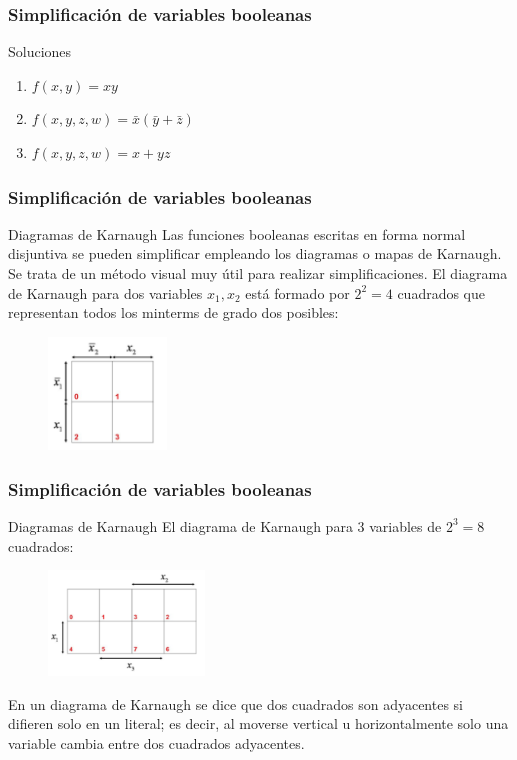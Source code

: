 \documentclass{beamer}
\begin{document}
\begin{frame}
\frametitle{Simplificaci\'on de variables booleanas}
\begin{block}{Soluciones}

\begin{enumerate}
\item $f(x,y) =xy$
\item $f(x,y,z,w) = \bar x (\bar y + \bar z)$
\item $f(x,y,z,w) =x + yz$
\end{enumerate}

\end{block}
\end{frame}





\begin{frame}
\frametitle{Simplificaci\'on de variables booleanas}
\begin{block}{Diagramas de Karnaugh}
Las funciones booleanas escritas en forma normal disjuntiva se pueden simplificar empleando los diagramas o mapas de Karnaugh. Se trata de un m\'etodo visual muy \'util para realizar simplificaciones. El diagrama de Karnaugh para dos variables $x_1,x_2$ est\'a formado por $2^2 = 4$ cuadrados que representan todos los minterms de grado dos posibles:
 \begin{figure}[h]
  \label{fig:volumen}
\centering
\includegraphics[height=3cm]{k1}
\end{figure}


\end{block}
\end{frame}



\begin{frame}
\frametitle{Simplificaci\'on de variables booleanas}
\begin{block}{Diagramas de Karnaugh}
El diagrama de Karnaugh para 3 variables de $2^3 = 8$ cuadrados:
 \begin{figure}[h]
  \label{fig:volum}
\centering
\includegraphics[height=2.8cm]{k2}
\end{figure}
En un diagrama de Karnaugh se dice que dos cuadrados son adyacentes si difieren solo en un literal; es decir, al moverse vertical u horizontalmente solo una variable cambia entre dos cuadrados adyacentes.
\end{block}
\end{frame}
\end{document}
